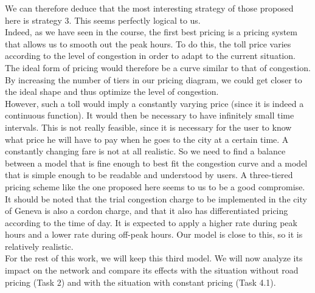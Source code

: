 \documentclass[a4paper, 12pt,oneside]{article}
\begin{document}
We can therefore deduce that the most interesting strategy of those proposed here is strategy 3. This seems perfectly logical to us.\\

Indeed, as we have seen in the course, the first best pricing is a pricing system that allows us to smooth out the peak hours. To do this, the toll price varies according to the level of congestion in order to adapt to the current situation. The ideal form of pricing would therefore be a curve similar to that of congestion. By increasing the number of tiers in our pricing diagram, we could get closer to the ideal shape and thus optimize the level of congestion.\\

However, such a toll would imply a constantly varying price (since it is indeed a continuous function). It would then be necessary to have infinitely small time intervals. This is not really feasible, since it is necessary for the user to know what price he will have to pay when he goes to the city at a certain time. A constantly changing fare is not at all realistic. So we need to find a balance between a model that is fine enough to best fit the congestion curve and a model that is simple enough to be readable and understood by users. A three-tiered pricing scheme like the one proposed here seems to us to be a good compromise.\\

It should be noted that the trial congestion charge to be implemented in the city of Geneva is also a cordon charge, and that it also has differentiated pricing according to the time of day. It is expected to apply a higher rate during peak hours and a lower rate during off-peak hours. Our model is close to this, so it is relatively realistic.\\

For the rest of this work, we will keep this third model. We will now analyze its impact on the network and compare its effects with the situation without road pricing (Task 2) and with the situation with constant pricing (Task 4.1).\\
\end{document}
